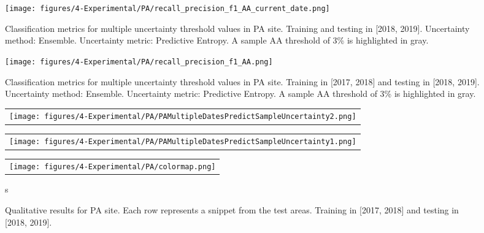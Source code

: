 \begin{figure*}[ht!]
\centering
\texttt{[image: figures/4-Experimental/PA/recall\_precision\_f1\_AA\_current\_date.png]}
\caption{Classification metrics for multiple uncertainty threshold values in PA site. Training and testing in [2018, 2019]. Uncertainty method: Ensemble. Uncertainty metric: Predictive Entropy. A sample AA threshold of 3\% is highlighted in \textcolor[HTML]{333333}{gray}.}
\label{fig:PA_audit_results_t1}
\end{figure*}


\begin{figure*}[ht!]
\centering
\texttt{[image: figures/4-Experimental/PA/recall\_precision\_f1\_AA.png]}
\caption{Classification metrics for multiple uncertainty threshold values in PA site. Training in [2017, 2018] and testing in [2018, 2019]. Uncertainty method: Ensemble. Uncertainty metric: Predictive Entropy. A sample AA threshold of 3\% is highlighted in \textcolor[HTML]{333333}{gray}.}
\label{fig:PA_audit_results_t0}
\end{figure*}

\begin{figure*}[ht!]
  \centering
  \begin{tabular}{@{}c@{}}
    \texttt{[image: figures/4-Experimental/PA/PAMultipleDatesPredictSampleUncertainty2.png]} \\[\abovecaptionskip]
  \end{tabular}

  \vspace*{-0.5\baselineskip}
  
  \begin{tabular}{@{}c@{}}
    \texttt{[image: figures/4-Experimental/PA/PAMultipleDatesPredictSampleUncertainty1.png]} \\[\abovecaptionskip]
  \end{tabular}
  \vspace*{-0.5\baselineskip}
  
  \begin{tabular}{@{}c@{}}
    \texttt{[image: figures/4-Experimental/PA/colormap.png]} \\[\abovecaptionskip]
  \end{tabular}

s  \caption{Qualitative results for PA site. Each row represents a snippet from the test areas. Training in [2017, 2018] and testing in [2018, 2019].}\label{fig:PAqualitative}
\end{figure*}

